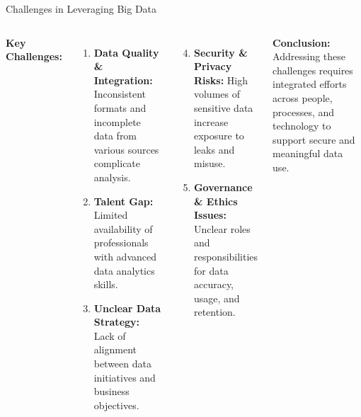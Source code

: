 \documentclass[aspectratio=169, table]{beamer}
\begin{document}
\begin{frame}[fragile]{Challenges in Leveraging Big Data}
	\vspace{20pt}
	\small
	\begin{columns}[T]
		\textbf{Key Challenges:}
		\begin{enumerate}
			\item \textbf{Data Quality \& Integration:} Inconsistent formats and incomplete data from various sources complicate analysis.
			\item \textbf{Talent Gap:} Limited availability of professionals with advanced data analytics skills.
			\item \textbf{Unclear Data Strategy:} Lack of alignment between data initiatives and business objectives.
		\end{enumerate}
		
		\begin{enumerate}
			\setcounter{enumi}{3}
			\item \textbf{Security \& Privacy Risks:} High volumes of sensitive data increase exposure to leaks and misuse.
			\item \textbf{Governance \& Ethics Issues:} Unclear roles and responsibilities for data accuracy, usage, and retention.
		\end{enumerate}
		
		\textbf{Conclusion:}  
		Addressing these challenges requires integrated efforts across people, processes, and technology to support secure and meaningful data use.
	\end{columns}
\end{frame}
\end{document}
